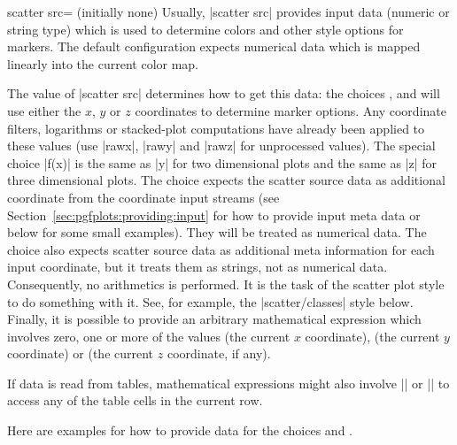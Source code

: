 {\begin{pgfplotskey}{scatter src= (initially none)%
}
    Usually, |scatter src| provides input data (numeric or string type) which
    is used to determine colors and other style options for markers. The
    default configuration expects numerical data which is mapped linearly into
    the current color map.

    The value of |scatter src| determines how to get this data: the choices
    ,  and  will use either the
    $x$, $y$ or $z$ coordinates to determine marker options. Any coordinate
    filters, logarithms or stacked-plot computations have already been applied
    to these values (use |rawx|, |rawy| and |rawz| for unprocessed values). The
    special choice |f(x)| is the same as |y| for two dimensional plots and the
    same as |z| for three dimensional plots. The choice 
    expects the scatter source data as additional coordinate from the
    coordinate input streams (see Section~\ref{sec:pgfplots:providing:input} for
    how to provide input meta data or below for some small examples). They will
    be treated as numerical data. The choice 
    also expects scatter source data as additional meta information for each
    input coordinate, but it treats them as strings,  not as numerical data.
    Consequently, no arithmetics is performed. It is the task of the scatter
    plot style to do something with it. See, for example, the |scatter/classes|
    style below. Finally, it is possible to provide an arbitrary mathematical
    expression which involves zero, one or more of the values 
    (the current $x$ coordinate),  (the current $y$ coordinate)
    or  (the current $z$ coordinate, if any).

    If data is read from tables, mathematical expressions might also involve
    |\thisrow| or |\thisrowno| to access
    any of the table cells in the current row.

    Here are examples for how to provide data for the choices
     and .
\begin{codeexample}
\end{codeexample}
\end{pgfplotskey}}
